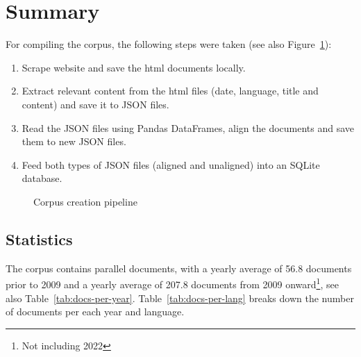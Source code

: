 
\section{Summary}
For compiling the corpus, the following steps were taken (see also Figure~\ref{fig:corpus-creation-pipeline}):
\begin{enumerate}
	\item Scrape website and save the \acrshort{html} documents locally.
	\item Extract relevant content from the \acrshort{html} files (date, language, title and content) and save  it to \acrshort{JSON} files.
	\item Read the \acrshort{JSON} files using Pandas DataFrames, align the documents and save them to new \acrshort{JSON} files.
	\item Feed both types of \acrshort{JSON} files (aligned and unaligned) into an SQLite database.
\end{enumerate}

\begin{figure}
\centering
{}
\caption{Corpus creation pipeline}
\label{fig:corpus-creation-pipeline}
\end{figure}


\subsection{Statistics}
The corpus contains  parallel documents, with a yearly average of 56.8 documents prior to 2009 and a yearly average of 207.8 documents from 2009 onward\footnote{Not including 2022}, 
see also Table~\ref{tab:docs-per-year}. Table~\ref{tab:docs-per-lang} breaks down the number of documents per each year and language. 

